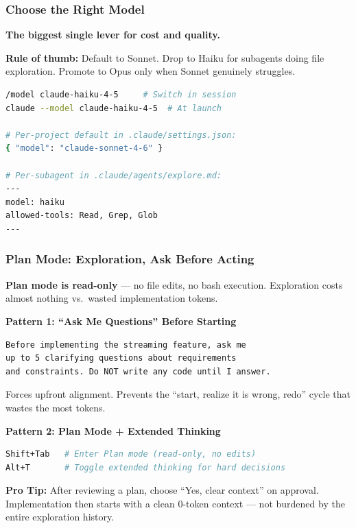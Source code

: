 \begin{frame}[fragile]\frametitle{Choose the Right Model}
\textbf{The biggest single lever for cost and quality.}
\begin{center}
\end{center}
\textbf{Rule of thumb:} Default to Sonnet. Drop to Haiku for subagents doing file exploration. Promote to Opus only when Sonnet genuinely struggles.
\begin{lstlisting}[language=bash]
/model claude-haiku-4-5     # Switch in session
claude --model claude-haiku-4-5  # At launch

# Per-project default in .claude/settings.json:
{ "model": "claude-sonnet-4-6" }

# Per-subagent in .claude/agents/explore.md:
---
model: haiku
allowed-tools: Read, Grep, Glob
---
\end{lstlisting}
\end{frame}

\begin{frame}[fragile]\frametitle{Plan Mode: Exploration, Ask Before Acting}
\textbf{Plan mode is read-only} --- no file edits, no bash execution. Exploration costs almost nothing vs.\ wasted implementation tokens.

\textbf{Pattern 1: ``Ask Me Questions'' Before Starting}
\begin{lstlisting}
Before implementing the streaming feature, ask me
up to 5 clarifying questions about requirements
and constraints. Do NOT write any code until I answer.
\end{lstlisting}
Forces upfront alignment. Prevents the ``start, realize it is wrong, redo'' cycle that wastes the most tokens.

\textbf{Pattern 2: Plan Mode + Extended Thinking}
\begin{lstlisting}[language=bash]
Shift+Tab   # Enter Plan mode (read-only, no edits)
Alt+T       # Toggle extended thinking for hard decisions
\end{lstlisting}

\textbf{Pro Tip:} After reviewing a plan, choose ``Yes, clear context'' on approval. Implementation then starts with a clean 0-token context --- not burdened by the entire exploration history.
\end{frame}

